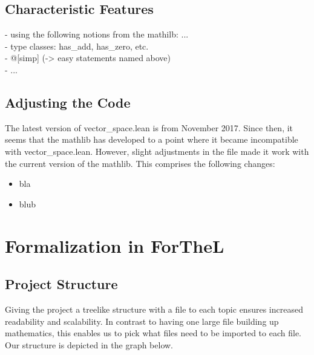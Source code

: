 \documentclass[11pt]{article}
\begin{document}
\subsection{Characteristic Features}
- using the following notions from the mathilb: ... \\
- type classes: has\_add, has\_zero, etc. \\
- @[simp] (-> easy statements named above)\\
- ...



\subsection{Adjusting the Code}
The latest version of vector\_space.lean is from November 2017. Since then, it seems that the mathlib has developed to a point where it became incompatible with vector\_space.lean.
However, slight adjustments in the file made it work with the current version of the mathlib. This comprises the following changes:
\begin{itemize}
\item bla
\item blub
\end{itemize}

\newpage



\section{Formalization in ForTheL}
\subsection{Project Structure}
Giving the project a treelike structure with a file to each topic ensures increased readability and scalability. 
In contrast to having one large file building up mathematics, this enables us to pick what files need to be imported to each file. 
Our structure is depicted in the graph below.
\end{document}
